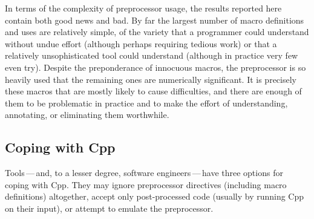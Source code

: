 \documentclass[11pt]{article}
\begin{document}
In terms of the complexity of preprocessor usage, the results reported here
contain both good news and bad.  By far
the largest number of macro definitions and uses are relatively simple, of
the variety that a programmer could understand without undue effort (although
perhaps requiring tedious work) or that a relatively unsophisticated tool
could understand (although in practice very few even try).  Despite the
preponderance of innocuous macros, the preprocessor is so heavily used that
the remaining ones are numerically significant.  It is precisely these
macros that are mostly likely to cause difficulties, and there are enough
of them to be problematic in practice and to make the effort of
understanding, annotating, or eliminating them worthwhile.




%


\subsection{Coping with Cpp}

Tools\,---\,and, to a lesser degree, software engineers\,---\,have three
options for coping with Cpp.    They may ignore preprocessor directives
(including macro definitions) altogether, accept only post-processed code
(usually by running Cpp on their input), or attempt to emulate the
preprocessor.
\end{document}
